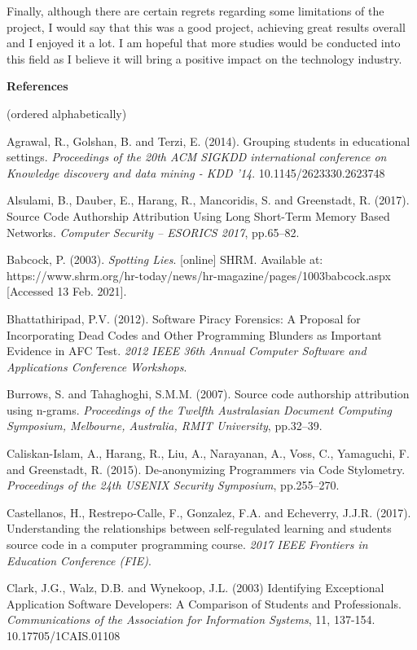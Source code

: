\documentclass{report}
\begin{document}
Finally, although there are certain regrets regarding some limitations of the project, I would say that this was a good project, achieving great results overall and I enjoyed it a lot. I am hopeful that more studies would be conducted into this field as I believe it will bring a positive impact on the technology industry.

\newpage
{}
\begin{center}
    \textbf{References}
\end{center}
(ordered alphabetically)

Agrawal, R., Golshan, B. and Terzi, E. (2014). Grouping students in educational settings. \textit{Proceedings of the 20th ACM SIGKDD international conference on Knowledge discovery and data mining - KDD ’14}. 10.1145/2623330.2623748

Alsulami, B., Dauber, E., Harang, R., Mancoridis, S. and Greenstadt, R. (2017). Source Code Authorship Attribution Using Long Short-Term Memory Based Networks. \textit{Computer Security – ESORICS 2017}, pp.65–82.

Babcock, P. (2003). \textit{Spotting Lies}. [online] SHRM. Available at: https://www.shrm.org/hr-today/news/hr-magazine/pages/1003babcock.aspx [Accessed 13 Feb. 2021].

Bhattathiripad, P.V. (2012). Software Piracy Forensics: A Proposal for Incorporating Dead Codes and Other Programming Blunders as Important Evidence in AFC Test. \textit{2012 IEEE 36th Annual Computer Software and Applications Conference Workshops}.

Burrows, S. and Tahaghoghi, S.M.M. (2007). Source code authorship attribution using n-grams. \textit{Proceedings of the Twelfth Australasian Document Computing Symposium, Melbourne, Australia, RMIT University}, pp.32–39.

Caliskan-Islam, A., Harang, R., Liu, A., Narayanan, A., Voss, C., Yamaguchi, F. and Greenstadt, R. (2015). De-anonymizing Programmers via Code Stylometry. \textit{Proceedings of the 24th USENIX Security Symposium}, pp.255–270.

Castellanos, H., Restrepo-Calle, F., Gonzalez, F.A. and Echeverry, J.J.R. (2017). Understanding the relationships between self-regulated learning and students source code in a computer programming course. \textit{2017 IEEE Frontiers in Education Conference (FIE)}.

Clark, J.G., Walz, D.B. and Wynekoop, J.L. (2003) Identifying Exceptional Application Software Developers: A Comparison of Students and Professionals. \textit{Communications of the Association for Information Systems}, 11, 137-154. 10.17705/1CAIS.01108
\end{document}
